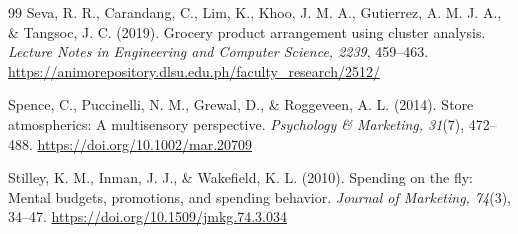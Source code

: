 \documentclass[sigconf,nonacm]{acmart}
\begin{document}
\begin{thebibliography}{99}
Seva, R. R., Carandang, C., Lim, K., Khoo, J. M. A., Gutierrez, A. M. J. A., \& Tangsoc, J. C. (2019). Grocery product arrangement using cluster analysis. \emph{Lecture Notes in Engineering and Computer Science, 2239}, 459--463. \url{https://animorepository.dlsu.edu.ph/faculty_research/2512/}

Spence, C., Puccinelli, N. M., Grewal, D., \& Roggeveen, A. L. (2014). Store atmospherics: A multisensory perspective. \emph{Psychology \& Marketing, 31}(7), 472--488. \url{https://doi.org/10.1002/mar.20709}

Stilley, K. M., Inman, J. J., \& Wakefield, K. L. (2010). Spending on the fly: Mental budgets, promotions, and spending behavior. \emph{Journal of Marketing, 74}(3), 34--47. \url{https://doi.org/10.1509/jmkg.74.3.034}

\end{thebibliography}
\end{document}
